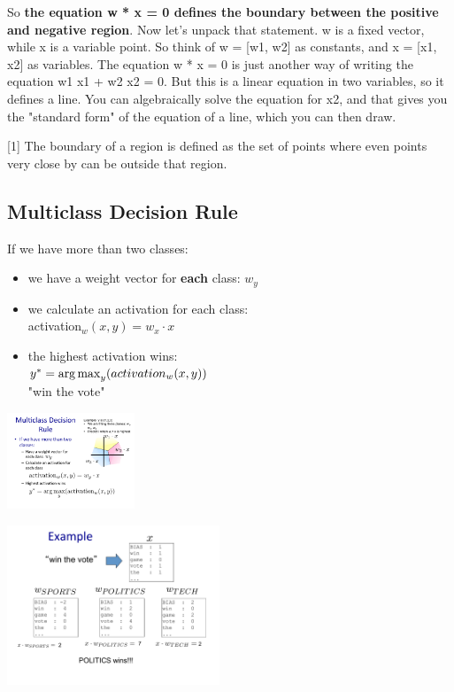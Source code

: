 So \textbf{the equation w * x = 0 defines the boundary between the positive and negative region}. Now let's unpack that statement. w is a fixed vector, while x is a variable point. So think of w = [w1, w2] as constants, and x = [x1, x2] as variables. The equation w * x = 0 is just another way of writing the equation w1 x1 + w2 x2 = 0. But this is a linear equation in two variables, so it defines a line. You can algebraically solve the equation for x2, and that gives you the "standard form" of the equation of a line, which you can then draw.

[1] The boundary of a region is defined as the set of points where even points very close by can be outside that region.

 
 \subsection{Multiclass Decision Rule}
 If we have more than two classes: 
 \begin{itemize}
 	\item we have a weight vector for \textbf{each} class: $w_y$
	\item we calculate an activation for each class: \hfill \\
		activation$_w(x,y) = w_x \cdot x$
	\item the highest activation wins:  \hfill \\
		$y^* = \operatorname*{arg\,max}_y(activation_w(x,y))$ \hfill \\
		"win the vote" 
 \end{itemize}
 
\includegraphics[width=1.5in]{figures/multiclass_decision_rule_planes.pdf}
 
\includegraphics[width=2.5in]{figures/perceptron_multiclass--win_the_vote.pdf}

